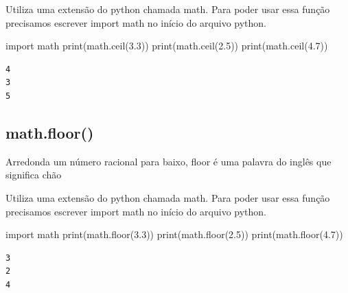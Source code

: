\documentclass[
  letterpaper,
  DIV=11,
  numbers=noendperiod]{scrreprt}
\newenvironment{Shaded}{\begin{snugshade}}{\end{snugshade}}
\newcommand{\BuiltInTok}[1]{\textcolor[rgb]{0.00,0.23,0.31}{#1}}
\newcommand{\FloatTok}[1]{\textcolor[rgb]{0.68,0.00,0.00}{#1}}
\newcommand{\ImportTok}[1]{\textcolor[rgb]{0.00,0.46,0.62}{#1}}
\newcommand{\NormalTok}[1]{\textcolor[rgb]{0.00,0.23,0.31}{#1}}
\begin{document}
Utiliza uma extensão do python chamada math. Para poder usar essa função
precisamos escrever import math no início do arquivo python.

\begin{Shaded}
\begin{Highlighting}[]
\ImportTok{import}\NormalTok{ math}
\BuiltInTok{print}\NormalTok{(math.ceil(}\FloatTok{3.3}\NormalTok{))}
\BuiltInTok{print}\NormalTok{(math.ceil(}\FloatTok{2.5}\NormalTok{))}
\BuiltInTok{print}\NormalTok{(math.ceil(}\FloatTok{4.7}\NormalTok{))}
\end{Highlighting}
\end{Shaded}

\begin{tcolorbox}[enhanced jigsaw, breakable, leftrule=.75mm, left=2mm, opacityback=0, bottomrule=.15mm, toprule=.15mm, rightrule=.15mm, arc=.35mm, colback=white]

\begin{verbatim}
4
3
5
\end{verbatim}

\end{tcolorbox}

\hypertarget{math.floor}{%
\subsection{math.floor()}\label{math.floor}}

Arredonda um número racional para baixo, floor é uma palavra do inglês
que significa chão

Utiliza uma extensão do python chamada math. Para poder usar essa função
precisamos escrever import math no início do arquivo python.

\begin{Shaded}
\begin{Highlighting}[]
\ImportTok{import}\NormalTok{ math}
\BuiltInTok{print}\NormalTok{(math.floor(}\FloatTok{3.3}\NormalTok{))}
\BuiltInTok{print}\NormalTok{(math.floor(}\FloatTok{2.5}\NormalTok{))}
\BuiltInTok{print}\NormalTok{(math.floor(}\FloatTok{4.7}\NormalTok{))}
\end{Highlighting}
\end{Shaded}

\begin{tcolorbox}[enhanced jigsaw, breakable, leftrule=.75mm, left=2mm, opacityback=0, bottomrule=.15mm, toprule=.15mm, rightrule=.15mm, arc=.35mm, colback=white]

\begin{verbatim}
3
2
4
\end{verbatim}

\end{tcolorbox}
\end{document}

